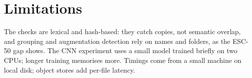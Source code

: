 \documentclass[sigconf,nonacm]{acmart}
\begin{document}
\section{Limitations}
The checks are lexical and hash-based: they catch copies, not semantic overlap, and grouping and
augmentation detection rely on names and folders, as the ESC-50 gap shows. The CNN experiment uses a
small model trained briefly on two CPUs; longer training memorises more. Timings come from a small
machine on local disk; object stores add per-file latency.



\end{document}
